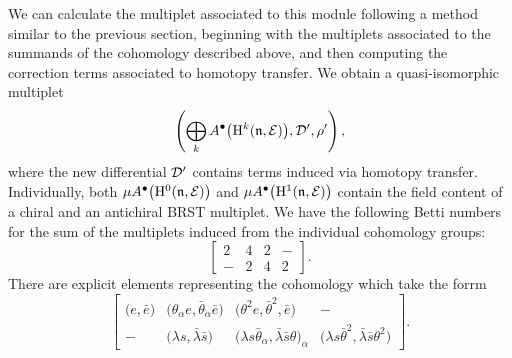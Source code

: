 \documentclass[pdftex]{sigma}
\numberwithin{equation}{section}
\def\cE{\mathcal E}\def\cF{\mathcal F}\def\cG{\mathcal G}\def\cH{\mathcal H}
\begin{document}
We can calculate the multiplet associated to this module following a method similar to the previous section, beginning with the multiplets associated to the summands of the cohomology described above, and then computing the correction terms associated to homotopy transfer. We obtain a quasi-isomorphic multiplet
\begin{equation*}
\left( \bigoplus_k A^\bullet\big(\mathrm H^k(\fn, \cE)\big) , \cD' , \rho' \right) ,
\end{equation*}
where the new differential $\mathcal D'$ contains terms induced via homotopy transfer. Individually, both $\mu A^\bullet\big(\mathrm H^0(\fn, \cE)\big)$ and $\mu A^\bullet\big(\mathrm H^1(\fn, \cE)\big)$ contain the field content of a chiral and an antichiral BRST multiplet. We have the following Betti numbers for the sum of the multiplets induced from the individual cohomology groups:
\begin{equation*}
\begin{bmatrix}
2 & 4 & 2 & - \\
- & 2 & 4 & 2
\end{bmatrix}.
\end{equation*}
There are explicit elements representing the cohomology which take the forrm
\begin{equation*}
\begin{bmatrix}
\big(e,\bar{e}\big) & \big(\theta_\alpha e ,\bar{\theta}_{\dot \alpha} \bar{e}\big) & \big(\theta^2 e, \bar{\theta}^2 ,\bar{e}\big) & -\\
- & \big(\lambda s , \bar{\lambda} \bar{s}\big) & \big(\lambda s \bar{\theta}_{\dot \alpha} , \bar{\lambda} \bar{s} \theta\big)_\alpha & \big(\lambda s \bar{\theta}^2 , \bar{\lambda} \bar{s} \theta^2\big)
\end{bmatrix} .
\end{equation*}
\end{document}
